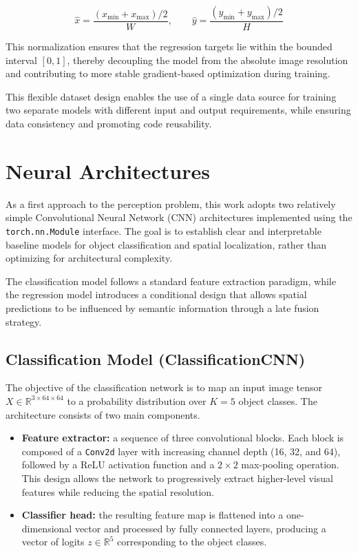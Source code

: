 \documentclass[a4paper,11pt]{article}
\begin{document}
\begin{equation}
\hat{x} = \frac{(x_{\min} + x_{\max}) / 2}{W},
\qquad
\hat{y} = \frac{(y_{\min} + y_{\max}) / 2}{H}
\end{equation}

This normalization ensures that the regression targets lie within the bounded interval $[0, 1]$, thereby decoupling the model from the absolute image resolution and contributing to more stable gradient-based optimization during training.

This flexible dataset design enables the use of a single data source for training two separate models with different input and output requirements, while ensuring data consistency and promoting code reusability.

\section{Neural Architectures}

As a first approach to the perception problem, this work adopts two relatively simple Convolutional Neural Network (CNN) architectures implemented using the \texttt{torch.nn.Module} interface. The goal is to establish clear and interpretable baseline models for object classification and spatial localization, rather than optimizing for architectural complexity.

The classification model follows a standard feature extraction paradigm, while the regression model introduces a conditional design that allows spatial predictions to be influenced by semantic information through a late fusion strategy.

\subsection{Classification Model (ClassificationCNN)}

The objective of the classification network is to map an input image tensor
$X \in \mathbb{R}^{3 \times 64 \times 64}$ to a probability distribution over $K = 5$ object classes.
The architecture consists of two main components.

\begin{itemize}
    \item \textbf{Feature extractor:} a sequence of three convolutional blocks. Each block is composed of a \texttt{Conv2d} layer with increasing channel depth (16, 32, and 64), followed by a ReLU activation function and a $2 \times 2$ max-pooling operation. This design allows the network to progressively extract higher-level visual features while reducing the spatial resolution.

    \item \textbf{Classifier head:} the resulting feature map is flattened into a one-dimensional vector and processed by fully connected layers, producing a vector of logits $z \in \mathbb{R}^{5}$ corresponding to the object classes.
\end{itemize}
\end{document}
